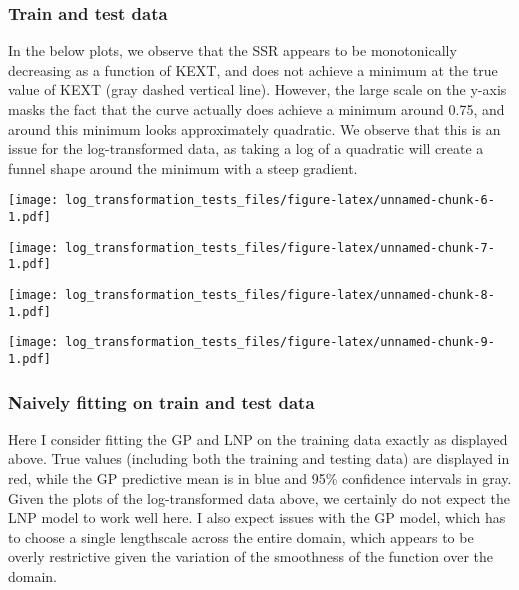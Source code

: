 \documentclass[
]{article}
\begin{document}
\hypertarget{train-and-test-data}{%
\subsubsection{Train and test data}\label{train-and-test-data}}

In the below plots, we observe that the SSR appears to be monotonically
decreasing as a function of KEXT, and does not achieve a minimum at the
true value of KEXT (gray dashed vertical line). However, the large scale
on the y-axis masks the fact that the curve actually does achieve a
minimum around 0.75, and around this minimum looks approximately
quadratic. We observe that this is an issue for the log-transformed
data, as taking a log of a quadratic will create a funnel shape around
the minimum with a steep gradient.

\texttt{[image: log\_transformation\_tests\_files/figure-latex/unnamed-chunk-6-1.pdf]}

\texttt{[image: log\_transformation\_tests\_files/figure-latex/unnamed-chunk-7-1.pdf]}

\texttt{[image: log\_transformation\_tests\_files/figure-latex/unnamed-chunk-8-1.pdf]}

\texttt{[image: log\_transformation\_tests\_files/figure-latex/unnamed-chunk-9-1.pdf]}

\hypertarget{naively-fitting-on-train-and-test-data}{%
\subsubsection{Naively fitting on train and test
data}\label{naively-fitting-on-train-and-test-data}}

Here I consider fitting the GP and LNP on the training data exactly as
displayed above. True values (including both the training and testing
data) are displayed in red, while the GP predictive mean is in blue and
95\% confidence intervals in gray. Given the plots of the
log-transformed data above, we certainly do not expect the LNP model to
work well here. I also expect issues with the GP model, which has to
choose a single lengthscale across the entire domain, which appears to
be overly restrictive given the variation of the smoothness of the
function over the domain.
\end{document}
